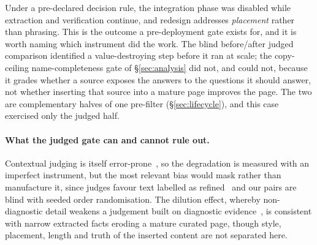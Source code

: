 \documentclass[10pt,twocolumn]{article}
\begin{document}
Under a pre-declared decision rule, the integration phase was disabled while extraction and
verification continue, and redesign addresses \emph{placement} rather than phrasing. This is the outcome a pre-deployment gate exists for, and it is worth naming which instrument did
the work. The blind before/after judged comparison identified a value-destroying step before it ran at
scale; the copy-ceiling name-completeness gate of \S\ref{sec:analysis} did not, and could not, because it
grades whether a source exposes the answers to the questions it should answer, not whether inserting
that source into a mature page improves the page. The two are complementary halves of one pre-filter (\S\ref{sec:lifecycle}), and this case exercised
only the judged half.

\paragraph{What the judged gate can and cannot rule out.} Contextual judging is itself error-prone~\cite{contextualjudgebench2025}, so the degradation is measured with an imperfect instrument, but the most relevant bias would mask rather than manufacture it, since judges favour text labelled as refined~\cite{calmjudgebias2024} and our pairs are blind with seeded order randomisation. The dilution effect, whereby non-diagnostic detail weakens a judgement built on diagnostic evidence~\cite{nisbett1981dilution}, is consistent with narrow extracted facts eroding a mature curated page, though style, placement, length and truth of the inserted content are not separated here.
\end{document}
